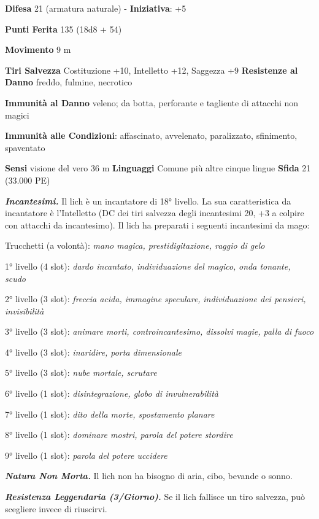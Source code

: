 \begin{multicols}{2}
\textbf{Difesa} 21 (armatura naturale) - \textbf{Iniziativa}: +5

\textbf{Punti Ferita} 135 (18d8 + 54)

\textbf{Movimento} 9 m

\textbf{Tiri Salvezza} Costituzione +10, Intelletto +12, Saggezza +9
\textbf{Resistenze al Danno} freddo, fulmine, necrotico

\textbf{Immunità al Danno} veleno; da botta, perforante e tagliente
di attacchi non magici

\textbf{Immunità alle Condizioni}: affascinato, avvelenato, paralizzato,
sfinimento, spaventato

\textbf{Sensi} visione del vero 36 m
\textbf{Linguaggi} Comune più altre cinque lingue \textbf{Sfida} 21
(33.000 PE)\smallskip

\emph{\textbf{Incantesimi.}} Il lich è un incantatore di 18° livello. La
sua caratteristica da incantatore è l'Intelletto (DC dei tiri salvezza
degli incantesimi 20, +3 a colpire con attacchi da incantesimo). Il lich
ha preparati i seguenti incantesimi da mago:

Trucchetti (a volontà): \emph{mano magica, prestidigitazione, raggio}
\emph{di gelo}

1° livello (4 slot): \emph{dardo incantato, individuazione del magico,}
\emph{onda tonante, scudo}

2° livello (3 slot): \emph{freccia acida, immagine speculare,}
\emph{individuazione dei pensieri, invisibilità}

3° livello (3 slot): \emph{animare morti, controincantesimo, dissolvi}
\emph{magie, palla di fuoco}

4° livello (3 slot): \emph{inaridire, porta dimensionale}

5° livello (3 slot): \emph{nube mortale, scrutare}

6° livello (1 slot): \emph{disintegrazione, globo di invulnerabilità}

7° livello (1 slot): \emph{dito della morte, spostamento planare}

8° livello (1 slot): \emph{dominare mostri, parola del potere stordire}

9° livello (1 slot): \emph{parola del potere uccidere}

\emph{\textbf{Natura Non Morta.}} Il lich non ha bisogno di aria, cibo,
bevande o sonno.

\emph{\textbf{Resistenza Leggendaria (3/Giorno).}} Se il lich fallisce
un tiro salvezza, può scegliere invece di riuscirvi.


\end{multicols}
